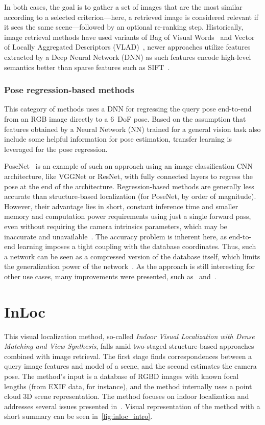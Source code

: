 In both cases, the goal is to gather a set of images that are the most similar according to a selected
criterion---here, a retrieved image is considered relevant if it sees the same scene---followed by an
optional re-ranking step. Historically, image retrieval methods have used variants of Bag of Visual Words~\citep{BoVW}
and Vector of Locally Aggregated Descriptors (VLAD)~\citep{VLAD},
newer approaches utilize features extracted by a Deep Neural Network (DNN) as such features encode high-level semantics
better than sparse features such as SIFT~\citep{RetrievalEE, DNNRegression, hausler2021patchnetvlad}.

\subsubsection*{Pose regression-based methods}

This category of methods uses a DNN for regressing the query pose end-to-end from an RGB image
directly to a 6~DoF pose. Based on the assumption that features obtained by a Neural Network (NN) trained for a general vision task
also include some helpful information for pose estimation, transfer learning is leveraged for the pose regression.

PoseNet~\citep{PoseNet} is an example of such an approach using an image classification CNN architecture, like
VGGNet or ResNet, with fully connected layers to regress the pose at the end of the architecture. Regression-based
methods are generally less accurate than structure-based localization (for PoseNet, by order of magnitude).
However, their advantage lies in short, constant inference time and smaller memory and computation power requirements
using just a single forward pass, even without requiring the camera intrinsics parameters, which may be
inaccurate and unavailable~\citep{RegressionAutoEnc}. The accuracy problem is inherent here, as end-to-end
learning imposes a tight coupling with the database coordinates. Thus, such a network can be seen as a compressed
version of the database itself, which limits the generalization power of the network~\citep{naverlabs}. As the approach is still
interesting for other use cases, many improvements were presented, such as~\citet{DNNRegression, Maps, VLocNet}
and~\citet{VLocNetpp}.


\section{InLoc}\label{sec:inloc}
This visual localization method, so-called \emph{Indoor Visual Localization with Dense Matching
and View Synthesis}, falls amid two-staged structure-based approaches combined with image retrieval. The first stage finds
correspondences between a query image features and model of a scene, and the second estimates the camera pose.
The method's input is a database of RGBD
images with known focal lengths (from EXIF data, for instance), and the method internally uses a point cloud 3D scene
representation. The method focuses on indoor localization and addresses several
issues presented in~. Visual representation of the method with a short summary can be seen in~\cref{fig:inloc_intro}.


